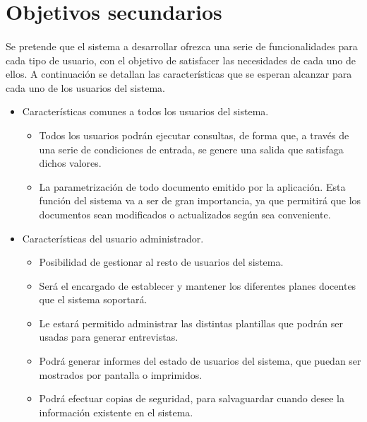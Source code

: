 \section{Objetivos secundarios}

\paragraph{}Se pretende que el sistema a desarrollar ofrezca una serie de
funcionalidades para cada tipo de usuario, con el objetivo de satisfacer las
necesidades de cada uno de ellos. A continuación se detallan las características
que se esperan alcanzar para cada uno de los usuarios del sistema.


\begin{itemize}
   \item Características comunes a todos los usuarios del sistema.
      \begin{itemize}
         \item Todos los usuarios podrán ejecutar consultas, de forma que, a
         través de una serie de condiciones de entrada, se genere una salida que
         satisfaga dichos valores.
         \item La parametrización de todo documento emitido por la aplicación.
         Esta función del sistema va a ser de gran importancia, ya que permitirá
         que los documentos sean modificados o actualizados según sea
         conveniente.
      \end{itemize}

   \item Características del usuario administrador.
      \begin{itemize}
         \item Posibilidad de gestionar al resto de usuarios del sistema.
         \item Será el encargado de establecer y mantener los diferentes planes
         docentes que el sistema soportará.
         \item Le estará permitido administrar las distintas plantillas
         que podrán ser usadas para generar entrevistas.
         \item Podrá generar informes del estado de usuarios del sistema, que
         puedan ser mostrados por pantalla o imprimidos.
         \item Podrá efectuar copias de seguridad, para salvaguardar cuando
         desee la información existente en el sistema.
      \end{itemize}


\end{itemize}
